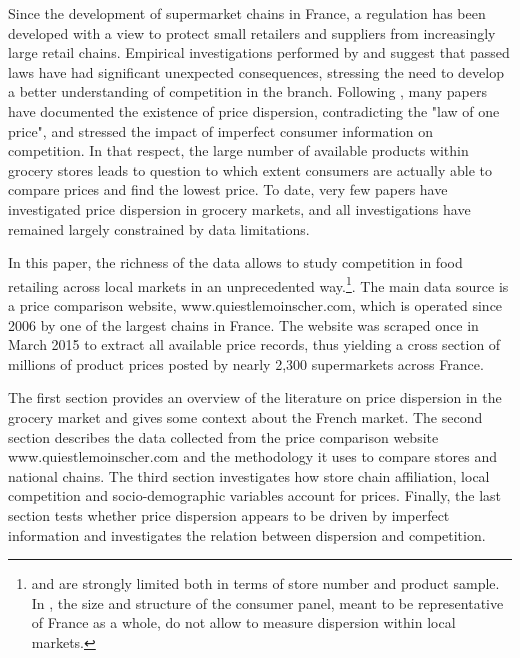 \documentclass[english]{article}
\begin{document}
Since the development of supermarket chains in France, a regulation has been developed with a view to protect small retailers and suppliers from increasingly large retail chains. Empirical investigations performed by \cite{BER02} and \cite{BIS13} suggest that passed laws have had significant unexpected consequences, stressing the need to develop a better understanding of competition in the branch. Following \cite{STI61}, many papers have documented the existence of price dispersion, contradicting the "law of one price", and stressed the impact of imperfect consumer information on competition. In that respect, the large number of available products within grocery stores leads to question to which extent consumers are actually able to compare prices and find the lowest price. To date, very few papers have investigated price dispersion in grocery markets, and all investigations have remained largely constrained by data limitations.

In this paper, the richness of the data allows to study competition in food retailing across local markets in an unprecedented way.\footnote{\cite{LAC02} and \cite{ZHA06} are strongly limited both in terms of store number and product sample. In \cite{PER15}, the size and structure of the consumer panel, meant to be representative of France as a whole, do not allow to measure dispersion within local markets.}. The main data source is a price comparison website, www.quiestlemoinscher.com, which is operated since 2006 by one of the largest chains in France. The website was scraped once in March 2015 to extract all available price records, thus yielding a cross section of millions of product prices posted by nearly 2,300 supermarkets across France.

The first section provides an overview of the literature on price dispersion in the grocery market and gives some context about the French market. The second section describes the data collected from the price comparison website www.quiestlemoinscher.com and the methodology it uses to compare stores and national chains. The third section investigates how store chain affiliation, local competition and socio-demographic variables account for prices. Finally, the last section tests whether price dispersion appears to be driven by imperfect information and investigates the relation between dispersion and competition.
\end{document}
